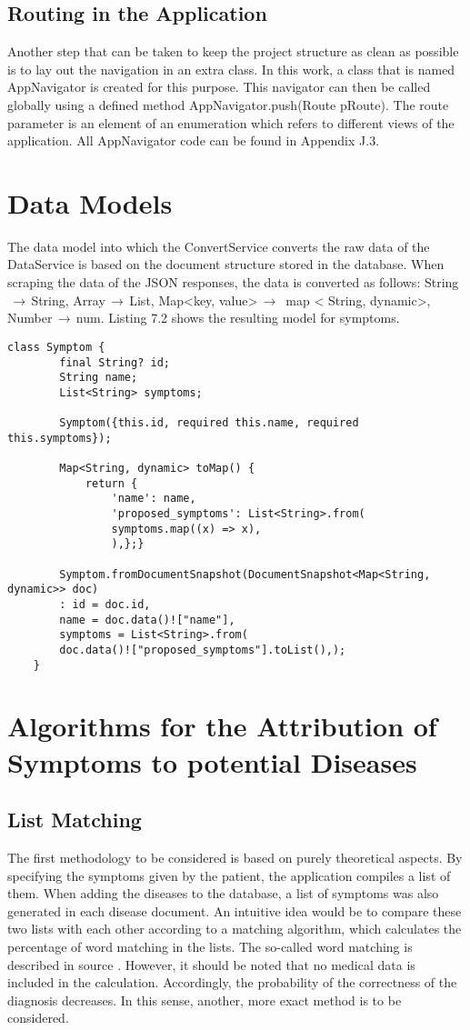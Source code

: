 \subsection{Routing in the Application}
Another step that can be taken to keep the project structure as clean as possible is to lay out the navigation in an extra class. In this work, a class that is named AppNavigator is created for this purpose. This navigator can then be called globally using a defined method AppNavigator.push(Route pRoute). The route parameter is an element of an enumeration which refers to different views of the application. All AppNavigator code can be found in Appendix J.3.
\section{Data Models}
The data model into which the ConvertService converts the raw data of the DataService is based on the document structure stored in the database. When scraping the data of the JSON responses, the data is converted as follows: String$\,\to\,$String, Array$\,\to\,$List, Map<key, value>$\,\to\,$ map < String, dynamic>, Number$\,\to\,$num. Listing 7.2 shows the resulting model for symptoms.
\scriptsize
\begin{lstlisting}[caption=Model for Symptoms]
	class Symptom {
		final String? id;
		String name;
		List<String> symptoms;
		
		Symptom({this.id, required this.name, required this.symptoms});
		
		Map<String, dynamic> toMap() {
			return {
				'name': name,
				'proposed_symptoms': List<String>.from(
				symptoms.map((x) => x),
				),};}
		
		Symptom.fromDocumentSnapshot(DocumentSnapshot<Map<String, dynamic>> doc)
		: id = doc.id,
		name = doc.data()!["name"],
		symptoms = List<String>.from(
		doc.data()!["proposed_symptoms"].toList(),);	
	}
\end{lstlisting}
\normalsize


\section{Algorithms for the Attribution of Symptoms to potential Diseases}
\subsection{List Matching}
The first methodology to be considered is based on purely theoretical aspects. By specifying the symptoms given by the patient, the application compiles a list of them. When adding the diseases to the database, a list of symptoms was also generated in each disease document. An intuitive idea would be to compare these two lists with each other according to a matching algorithm, which calculates the percentage of word matching in the lists. The so-called word matching is described in source \cite{.wordmatching}. However, it should be noted that no medical data is included in the calculation. Accordingly, the probability of the correctness of the diagnosis decreases. In this sense, another, more exact method is to be considered.

